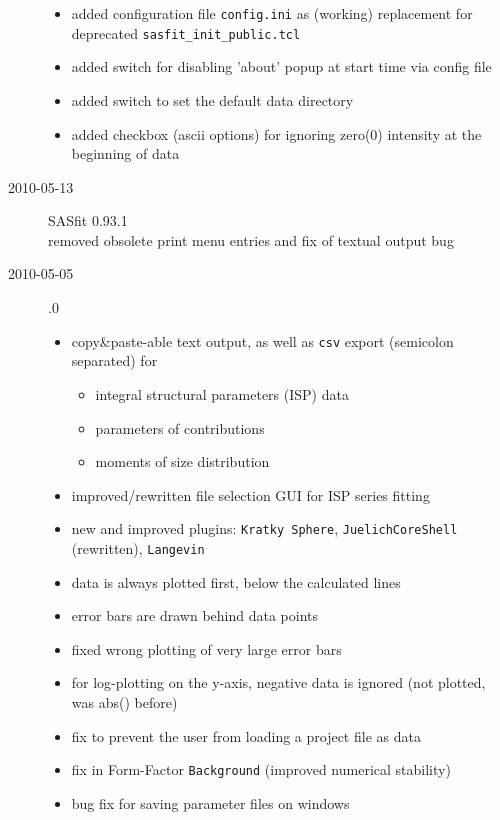 \begin{description}
\begin{itemize}
        \item added configuration file \texttt{config.ini} as (working) replacement for deprecated \texttt{sasfit\_init\_public.tcl}
        \item added switch for disabling 'about' popup at start time via config file
        \item added switch to set the default data directory
        \item added checkbox (ascii options) for ignoring zero(0) intensity at the beginning of data
        \end{itemize}
    \item[2010-05-13] SASfit 0.93.1 \\
    removed obsolete print menu entries and fix of textual output bug
    \item[2010-05-05] .0
        \begin{itemize}
            \item copy\&paste-able text output, as well as \texttt{csv} export (semicolon separated) for
            \begin{itemize}
                \item integral structural parameters (ISP) data
                \item parameters of contributions
                \item moments of size distribution
            \end{itemize}
            \item  improved/rewritten file selection GUI for ISP series fitting
            \item  new and improved plugins: \texttt{Kratky Sphere}, \texttt{JuelichCoreShell} (rewritten), \texttt{Langevin}
            \item data is always plotted first, below the calculated lines
            \item error bars are drawn behind data points
            \item fixed wrong plotting of very large error bars
            \item for log-plotting on the y-axis, negative data is ignored (not plotted, was abs() before)
            \item fix to prevent the user from loading a \SASfit project file as data
            \item fix in Form-Factor \texttt{Background} (improved numerical stability)
            \item bug fix for saving parameter files on windows

\end{itemize}
\end{description}

